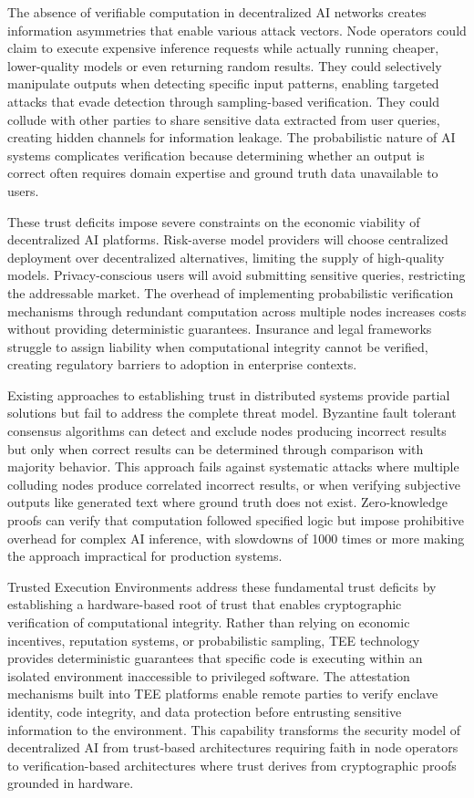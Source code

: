 The absence of verifiable computation in decentralized AI networks creates information asymmetries that enable various attack vectors. Node operators could claim to execute expensive inference requests while actually running cheaper, lower-quality models or even returning random results. They could selectively manipulate outputs when detecting specific input patterns, enabling targeted attacks that evade detection through sampling-based verification. They could collude with other parties to share sensitive data extracted from user queries, creating hidden channels for information leakage. The probabilistic nature of AI systems complicates verification because determining whether an output is correct often requires domain expertise and ground truth data unavailable to users.

These trust deficits impose severe constraints on the economic viability of decentralized AI platforms. Risk-averse model providers will choose centralized deployment over decentralized alternatives, limiting the supply of high-quality models. Privacy-conscious users will avoid submitting sensitive queries, restricting the addressable market. The overhead of implementing probabilistic verification mechanisms through redundant computation across multiple nodes increases costs without providing deterministic guarantees. Insurance and legal frameworks struggle to assign liability when computational integrity cannot be verified, creating regulatory barriers to adoption in enterprise contexts.

Existing approaches to establishing trust in distributed systems provide partial solutions but fail to address the complete threat model. Byzantine fault tolerant consensus algorithms can detect and exclude nodes producing incorrect results but only when correct results can be determined through comparison with majority behavior. This approach fails against systematic attacks where multiple colluding nodes produce correlated incorrect results, or when verifying subjective outputs like generated text where ground truth does not exist. Zero-knowledge proofs can verify that computation followed specified logic but impose prohibitive overhead for complex AI inference, with slowdowns of 1000 times or more making the approach impractical for production systems.

Trusted Execution Environments address these fundamental trust deficits by establishing a hardware-based root of trust that enables cryptographic verification of computational integrity. Rather than relying on economic incentives, reputation systems, or probabilistic sampling, TEE technology provides deterministic guarantees that specific code is executing within an isolated environment inaccessible to privileged software. The attestation mechanisms built into TEE platforms enable remote parties to verify enclave identity, code integrity, and data protection before entrusting sensitive information to the environment. This capability transforms the security model of decentralized AI from trust-based architectures requiring faith in node operators to verification-based architectures where trust derives from cryptographic proofs grounded in hardware.

